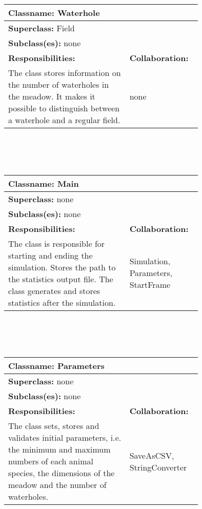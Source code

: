 \documentclass{article}
\begin{document}
\\ \\ \\
\begin{tabular}{|p{0.55\linewidth}|p{0.2\linewidth}|}
\hline
\multicolumn{2}{|l|}{\textbf{Classname:} Waterhole} \\
\hline
\multicolumn{2}{|l|}{\textbf{Superclass:} Field} \\
\multicolumn{2}{|l|}{\textbf{Subclass(es):} none} \\
\hline
\textbf{Responsibilities:}  &  \textbf{Collaboration:} \\
The class stores information on the number of waterholes in the meadow. It makes it possible to distinguish between a waterhole and a regular field. & none \\
\hline
\end{tabular}
\\ \\ \\
\begin{tabular}{|p{0.55\linewidth}|p{0.2\linewidth}|}
\hline
\multicolumn{2}{|l|}{\textbf{Classname:} Main} \\
\hline
\multicolumn{2}{|l|}{\textbf{Superclass:} none} \\
\multicolumn{2}{|l|}{\textbf{Subclass(es):} none} \\
\hline
\textbf{Responsibilities:}  &  \textbf{Collaboration:} \\
The class is responsible for starting and ending the simulation. Stores the path to the statistics output file. The class generates and stores statistics after the simulation. & Simulation, Parameters, StartFrame\\
\hline
\end{tabular}
\\ \\ \\
\begin{tabular}{|p{0.55\linewidth}|p{0.2\linewidth}|}
\hline
\multicolumn{2}{|l|}{\textbf{Classname:} Parameters} \\
\hline
\multicolumn{2}{|l|}{\textbf{Superclass:} none} \\
\multicolumn{2}{|l|}{\textbf{Subclass(es):} none} \\
\hline
\textbf{Responsibilities:}  &  \textbf{Collaboration:} \\
The class sets, stores and validates initial parameters, i.e. the minimum and maximum numbers of each animal species, the dimensions of the meadow and the number of waterholes. & SaveAsCSV, StringConverter\\
\hline
\end{tabular}
\end{document}
